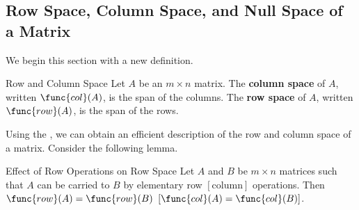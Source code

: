 \subsection{Row Space, Column Space, and Null Space of a Matrix}

We begin this section with a new definition.

\begin{definition}{Row and Column Space}\label{def:rowcolumnspace}
Let $A$ be an $m\times n$ matrix. The \textbf{column space} of $A$, written $\func{col}(A)$, is the
span of the columns. The \textbf{row space} of $A$, written $\func{row}(A)$, is the span of the rows.
\end{definition}

Using the \rref \;, we can obtain an efficient description of the row and column space of
a matrix. Consider the following lemma.

\begin{lemma}{Effect of Row Operations on Row Space}\label{lem:rowoperationsrowspace}
Let $A$ and $B$ be $m\times n$ matrices such that $A$ can be carried to $B$ by elementary row $\left[ \mbox{column} \right]$ operations. Then $\func{row}(A)=\func{row}(B)$ $\left[\func{col}(A)=\func{col}(B) \right]$.
\end{lemma}

